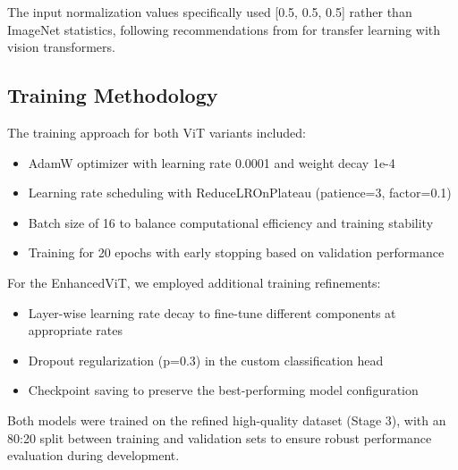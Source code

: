 The input normalization values specifically used [0.5, 0.5, 0.5] rather than ImageNet statistics, following recommendations from\citep{touvron2021training} for transfer learning with vision transformers.

\subsection{Training Methodology}

The training approach for both ViT variants included:

\begin{itemize}
    \item AdamW optimizer with learning rate 0.0001 and weight decay 1e-4
    \item Learning rate scheduling with ReduceLROnPlateau (patience=3, factor=0.1)
    \item Batch size of 16 to balance computational efficiency and training stability
    \item Training for 20 epochs with early stopping based on validation performance
\end{itemize}

For the EnhancedViT, we employed additional training refinements:

\begin{itemize}
    \item Layer-wise learning rate decay to fine-tune different components at appropriate rates
    \item Dropout regularization (p=0.3) in the custom classification head
    \item Checkpoint saving to preserve the best-performing model configuration
\end{itemize}

Both models were trained on the refined high-quality dataset (Stage 3), with an 80:20 split between training and validation sets to ensure robust performance evaluation during development.
